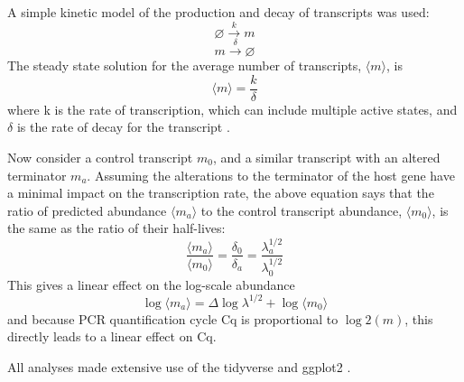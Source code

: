 \documentclass[../main.tex]{subfiles}
\begin{document}
A simple kinetic model of the production and decay of transcripts was used:
\[\varnothing \xrightarrow{k} m\]
\[m \xrightarrow{\delta}  \varnothing\]
The steady state solution for the average number of transcripts, \(\langle m \rangle\), is
\[\langle m \rangle = \frac{k}{\delta}\]
where k is the rate of transcription, which can include multiple active states, and \(\delta\) is the rate of decay for the transcript \parencite{Sanchez2008}.

Now consider a control transcript \(m_0\), and a similar transcript with an altered terminator \(m_a\). Assuming the alterations to the terminator of the host gene have a minimal impact on the transcription rate, the above equation says that the ratio of predicted abundance \(\langle m_a \rangle\) to the control transcript abundance, \(\langle m_0 \rangle\), is the same as the ratio of their half-lives:
\[\frac{\langle m_a \rangle}{\langle m_0 \rangle} = \frac{\delta_0}{\delta_a} =\frac{\lambda^{1/2}_a}{\lambda^{1/2}_0}\]
This gives a linear effect on the log-scale abundance
\[\log\langle m_a \rangle =\Delta \log\lambda^{1/2} + \log\langle m_0 \rangle\]
and because PCR quantification cycle Cq is proportional to \(\log2(m)\), this directly leads to a linear effect on Cq.

All analyses made extensive use of the tidyverse and ggplot2 \parencite{Wickham2016, Wickham2019}.
\end{document}

